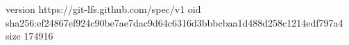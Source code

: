 version https://git-lfs.github.com/spec/v1
oid sha256:ef24867ef924c90be7ae7dac9d64c6316d3bbbcbaa1d488d258c1214edf797a4
size 174916
